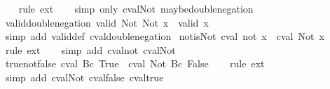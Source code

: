 \begin{isabellebody}
\ \ %
\endisadelimproof
%
\isatagproof
{}\isamarkupfalse%
\ {\isacharparenleft}rule\ ext{\isacharparenright}{\isacharplus}\isanewline
\ \ \isamarkupfalse%
\ {\isacharparenleft}simp\ only{\isacharcolon}\ cval{\isacharunderscore}Not\ maybe{\isacharunderscore}double{\isacharunderscore}negation{\isacharparenright}%
\endisatagproof
{\isafoldproof}%
%
\isadelimproof
\isanewline
%
\endisadelimproof
\isanewline
{}\isamarkupfalse%
\ valid{\isacharunderscore}double{\isacharunderscore}negation{\isacharcolon}\ {\isachardoublequoteopen}valid\ {\isacharparenleft}Not\ {\isacharparenleft}Not\ x{\isacharparenright}{\isacharparenright}\ {\isacharequal}\ valid\ x{\isachardoublequoteclose}\isanewline
%
\isadelimproof
\ \ %
\endisadelimproof
%
\isatagproof
{}\isamarkupfalse%
\ {\isacharparenleft}simp\ add{\isacharcolon}\ valid{\isacharunderscore}def\ cval{\isacharunderscore}double{\isacharunderscore}negation{\isacharparenright}%
\endisatagproof
{\isafoldproof}%
%
\isadelimproof
\isanewline
%
\endisadelimproof
\isanewline
{}\isamarkupfalse%
\ not{\isacharunderscore}is{\isacharunderscore}Not{\isacharcolon}\ {\isachardoublequoteopen}cval\ {\isacharparenleft}not\ x{\isacharparenright}\ {\isacharequal}\ cval\ {\isacharparenleft}Not\ x{\isacharparenright}{\isachardoublequoteclose}\isanewline
%
\isadelimproof
\ \ %
\endisadelimproof
%
\isatagproof
{}\isamarkupfalse%
\ {\isacharparenleft}rule\ ext{\isacharparenright}{\isacharplus}\isanewline
\ \ \isamarkupfalse%
\ {\isacharparenleft}simp\ add{\isacharcolon}\ cval{\isacharunderscore}not\ cval{\isacharunderscore}Not{\isacharparenright}%
\endisatagproof
{\isafoldproof}%
%
\isadelimproof
\isanewline
%
\endisadelimproof
\isanewline
{}\isamarkupfalse%
\ true{\isacharunderscore}not{\isacharunderscore}false{\isacharcolon}\ {\isachardoublequoteopen}cval\ {\isacharparenleft}Bc\ True{\isacharparenright}\ {\isacharequal}\ cval\ {\isacharparenleft}Not\ {\isacharparenleft}Bc\ False{\isacharparenright}{\isacharparenright}{\isachardoublequoteclose}\isanewline
%
\isadelimproof
\ \ %
\endisadelimproof
%
\isatagproof
{}\isamarkupfalse%
\ {\isacharparenleft}rule\ ext{\isacharparenright}{\isacharplus}\isanewline
\ \ \isamarkupfalse%
\ {\isacharparenleft}simp\ add{\isacharcolon}\ cval{\isacharunderscore}Not\ cval{\isacharunderscore}false\ cval{\isacharunderscore}true{\isacharparenright}%
\endisatagproof
{\isafoldproof}%
%
\isadelimproof
\isanewline
%
\endisadelimproof
\isanewline
{}\isamarkupfalse%

\end{isabellebody}
